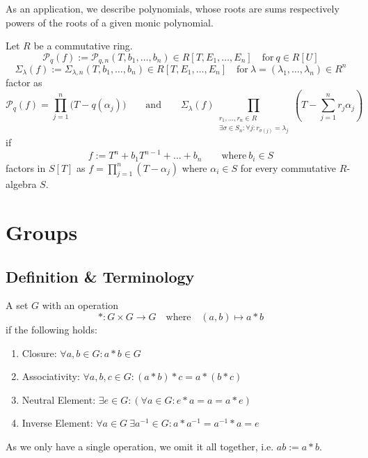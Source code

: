 As an application, we describe polynomials, whose roots are sums respectively powers of the roots of a given monic polynomial.
\begin{proposition}
   Let \(R\) be a commutative ring.
   \[\mathscr{P}_q(f) := \mathscr{P}_{q,n}(T, b_1, \ldots, b_n) \in R[T, E_1, \ldots, E_n] \quad\text{for}~q \in R[U]\]
   \[\Sigma_{\lambda}(f) := \Sigma_{\lambda, n}(T, b_1, \ldots, b_n) \in R[T, E_1, \ldots, E_n] \quad\text{for}~\lambda=(\lambda_1, \ldots, \lambda_n) \in R^n\]
   factor as
   \[\mathscr{P}_q(f) = \prod_{j=1}^n\big(T - q(\alpha_j)\big) \qquad\text{and}\qquad \Sigma_{\lambda}(f) \prod_{\substack{r_1, \ldots, r_n \in R\\\exists \sigma \in S_n: \forall j: r_{\sigma(j)} = \lambda_j}} \left(T - \sum_{j=1}^n r_j\alpha_j\right)\]
   if
   \[f := T^n + b_1T^{n-1} + \ldots + b_n \qquad\text{where}~b_i\in S\]
   factors in \(S[T]\) as \(f = \prod_{j=1}^n (T - \alpha_j)\) where \(\alpha_i \in S\) for every commutative \(R\)-algebra \(S\).
\end{proposition}

\newpage

\section{Groups}
\subsection{Definition \& Terminology}
\begin{definition}[Group]
   A set \(G\) with an operation
   \[\ast: G \times G \to G \quad\text{where}\quad (a, b) \mapsto a \ast b\]
   if the following holds:
   \begin{enumerate}[label=\roman*, align=Center]
      \item Closure: \(\forall a, b \in G: a \ast b \in G\)
      \item Associativity: \(\forall a, b, c \in G: (a \ast b) \ast c = a \ast (b \ast c)\)
      \item Neutral Element: \(\exists e \in G: (\forall a \in G: e \ast a = a = a \ast e)\)
      \item Inverse Element: \(\forall a \in G~\exists a^{-1} \in G: a \ast a^{-1} = a^{-1} \ast a = e\)
   \end{enumerate}
\end{definition}
\begin{remark}[Notation]
   As we only have a single operation, we omit it all together, i.e. \(ab := a \ast b\).
\end{remark}

